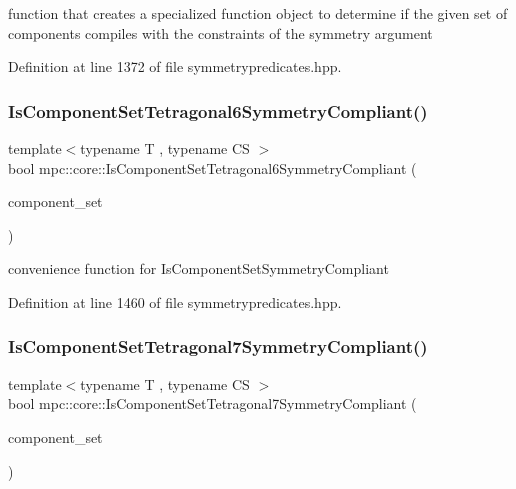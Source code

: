 function that creates a specialized function object to determine if the given set of components compiles with the constraints of the symmetry argument 



Definition at line 1372 of file symmetrypredicates.\+hpp.

\mbox{\label{namespacempc_1_1core_a3310295841e3459b8259d4f4976e0758}} 
\subsubsection{\texorpdfstring{Is\+Component\+Set\+Tetragonal6\+Symmetry\+Compliant()}{IsComponentSetTetragonal6SymmetryCompliant()}}
{\footnotesize\ttfamily template$<$typename T , typename CS $>$ \\
bool mpc\+::core\+::\+Is\+Component\+Set\+Tetragonal6\+Symmetry\+Compliant (\begin{DoxyParamCaption}\item[{const std\+::set$<$ \mbox{\hyperlink{namespacempc_1_1core_ac3a232afc7c680d580628e834030482f}{mpc\+::core\+::\+Tensor\+Rank4\+Component}}$<$ T $>$ $>$ \&}]{component\+\_\+set }\end{DoxyParamCaption})}



convenience function for Is\+Component\+Set\+Symmetry\+Compliant 



Definition at line 1460 of file symmetrypredicates.\+hpp.

\mbox{\label{namespacempc_1_1core_a92e4483941bd929b5081ebcec09dec55}} 
\subsubsection{\texorpdfstring{Is\+Component\+Set\+Tetragonal7\+Symmetry\+Compliant()}{IsComponentSetTetragonal7SymmetryCompliant()}}
{\footnotesize\ttfamily template$<$typename T , typename CS $>$ \\
bool mpc\+::core\+::\+Is\+Component\+Set\+Tetragonal7\+Symmetry\+Compliant (\begin{DoxyParamCaption}\item[{const std\+::set$<$ \mbox{\hyperlink{namespacempc_1_1core_ac3a232afc7c680d580628e834030482f}{mpc\+::core\+::\+Tensor\+Rank4\+Component}}$<$ T $>$ $>$ \&}]{component\+\_\+set }\end{DoxyParamCaption})}




